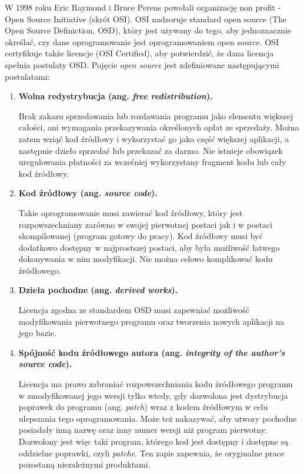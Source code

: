 \documentclass{article}
\begin{document}
W 1998 roku Eric Raymond i Bruce Perens powołali organizację non profit - Open Source Initiative (skrót OSI)\cite{Kotula}. OSI nadzoruje standard open source (The Open Source Definiction, OSD), który jest używany do tego, aby jednoznacznie określać, czy dane oprogramowanie jest oprogramowaniem open source. OSI certyfikuje także licencje (OSI Certified), aby potwierdzić, że dana
licencja spełnia postulaty OSD\cite{opensource.org}. Pojęcie \emph{open source} jest zdefiniowane następującymi postulatami\cite{Kotula}:

\begin{enumerate}
    \item \textbf{Wolna redystrybucja (ang. \emph{free redistribution}).}
    
    \hspace{4mm} Brak zakazu sprzedawania lub rozdawania programu jako elementu większej całości, ani wymagania przekazywania określonych opłat ze sprzedaży. Można zatem wziąć kod źródłowy i wykorzystać go jako część większej aplikacji, a następnie dzieło sprzedać lub przekazać za darmo. Nie istnieje obowiązek uregulowania płatności za wcześniej wykorzystany fragment kodu lub cały kod źródłowy.
    
    \item \textbf{Kod źródłowy (ang. \emph{source code}).}
    
    \hspace{4mm} Takie oprogramowanie musi zawierać kod źródłowy, który jest rozpowszechniany zarówno w swojej pierwotnej postaci jak i w postaci skompilowanej (program gotowy do pracy). Kod źródłowy musi być dodatkowo dostępny w najprostszej postaci, aby była możliwość łatwego dokonywania w nim modyfikacji. Nie można celowo komplikować kodu źródłowego.
    
    \item \textbf{Dzieła pochodne (ang. \emph{derived works}).}
    
    \hspace{4mm} Licencja zgodna ze standardem OSD musi zapewniać możliwość modyfikowania pierwotnego programu oraz tworzenia nowych aplikacji na jego bazie.
    
    \item \textbf{Spójność kodu źródłowego autora (ang. \emph{integrity of the author’s source code}).}
    
    \hspace{4mm} Licencja ma prawo zabraniać rozpowszechniania kodu źródłowego programu w zmodyfikowanej jego wersji tylko wtedy, gdy dozwolona jest dystrybucja poprawek do programu (ang. \emph{patch}) wraz z kodem źródłowym w celu ulepszania tego oprogramowania. Może też nakazywać, aby utwory pochodne posiadały inną nazwę oraz inny numer wersji niż program pierwotny. Dozwolony jest więc taki program, którego kod jest dostępny i dostępne są oddzielne poprawki, czyli \emph{patche}. Ten zapis zapewnia, że oryginalne prace pozostaną niezależnymi produktami.
    

\end{enumerate}
\end{document}
